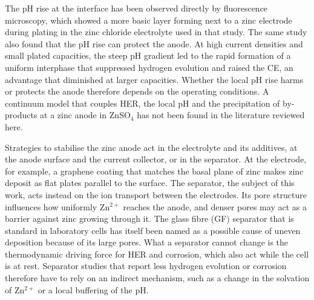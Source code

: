 The pH rise at the interface has been observed directly by fluorescence microscopy, which showed a more basic layer forming next to a zinc electrode during plating in the zinc chloride electrolyte used in that study\cite{rana_interfacial_2025}.
The same study also found that the pH rise can protect the anode.
At high current densities and small plated capacities, the steep pH gradient led to the rapid formation of a uniform interphase that suppressed hydrogen evolution and raised the CE, an advantage that diminished at larger capacities\cite{rana_interfacial_2025}.
Whether the local pH rise harms or protects the anode therefore depends on the operating conditions.
A continuum model that couples HER, the local pH and the precipitation of by-products at a zinc anode in ZnSO$_4$ has not been found in the literature reviewed here.

Strategies to stabilise the zinc anode act in the electrolyte and its additives, at the anode surface and the current collector, or in the separator\cite{rana_electroanalytical_2025}.
At the electrode, for example, a graphene coating that matches the basal plane of zinc makes zinc deposit as flat plates parallel to the surface\cite{zheng_reversible_2019}.
The separator, the subject of this work, acts instead on the ion transport between the electrodes.
Its pore structure influences how uniformly Zn$^{2+}$ reaches the anode, and denser pores may act as a barrier against zinc growing through it\cite{hansen_role_2023,gu_role_2025}.
The glass fibre (GF) separator that is standard in laboratory cells\cite{gu_role_2025} has itself been named as a possible cause of uneven deposition because of its large pores\cite{dong_towards_2022}.
What a separator cannot change is the thermodynamic driving force for HER and corrosion, which also act while the cell is at rest\cite{rana_electroanalytical_2025}.
Separator studies that report less hydrogen evolution or corrosion therefore have to rely on an indirect mechanism, such as a change in the solvation of Zn$^{2+}$ or a local buffering of the pH.

